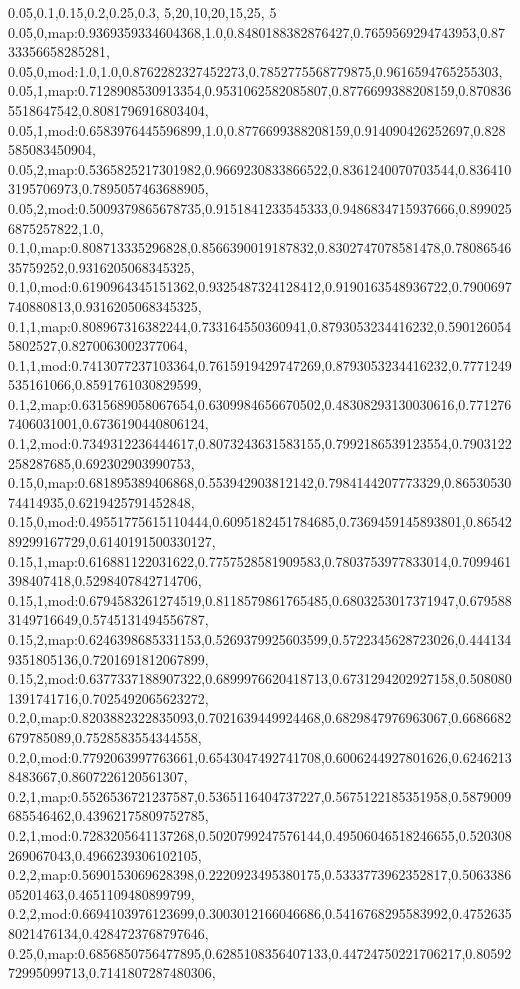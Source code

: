 0.05,0.1,0.15,0.2,0.25,0.3,
5,20,10,20,15,25,
5
0.05,0,map:0.9369359334604368,1.0,0.8480188382876427,0.7659569294743953,0.8733356658285281,
0.05,0,mod:1.0,1.0,0.8762282327452273,0.7852775568779875,0.9616594765255303,
0.05,1,map:0.7128908530913354,0.9531062582085807,0.8776699388208159,0.8708365518647542,0.8081796916803404,
0.05,1,mod:0.6583976445596899,1.0,0.8776699388208159,0.914090426252697,0.828585083450904,
0.05,2,map:0.5365825217301982,0.9669230833866522,0.8361240070703544,0.8364103195706973,0.7895057463688905,
0.05,2,mod:0.5009379865678735,0.9151841233545333,0.9486834715937666,0.8990256875257822,1.0,
0.1,0,map:0.808713335296828,0.8566390019187832,0.8302747078581478,0.7808654635759252,0.9316205068345325,
0.1,0,mod:0.6190964345151362,0.9325487324128412,0.9190163548936722,0.7900697740880813,0.9316205068345325,
0.1,1,map:0.808967316382244,0.733164550360941,0.8793053234416232,0.5901260545802527,0.8270063002377064,
0.1,1,mod:0.7413077237103364,0.7615919429747269,0.8793053234416232,0.7771249535161066,0.8591761030829599,
0.1,2,map:0.6315689058067654,0.6309984656670502,0.48308293130030616,0.7712767406031001,0.6736190440806124,
0.1,2,mod:0.7349312236444617,0.8073243631583155,0.7992186539123554,0.7903122258287685,0.692302903990753,
0.15,0,map:0.681895389406868,0.553942903812142,0.7984144207773329,0.8653053074414935,0.6219425791452848,
0.15,0,mod:0.49551775615110444,0.6095182451784685,0.7369459145893801,0.8654289299167729,0.6140191500330127,
0.15,1,map:0.616881122031622,0.7757528581909583,0.7803753977833014,0.7099461398407418,0.5298407842714706,
0.15,1,mod:0.6794583261274519,0.8118579861765485,0.6803253017371947,0.6795883149716649,0.5745131494556787,
0.15,2,map:0.6246398685331153,0.5269379925603599,0.5722345628723026,0.4441349351805136,0.7201691812067899,
0.15,2,mod:0.6377337188907322,0.6899976620418713,0.6731294202927158,0.5080801391741716,0.7025492065623272,
0.2,0,map:0.8203882322835093,0.7021639449924468,0.6829847976963067,0.6686682679785089,0.7528583554344558,
0.2,0,mod:0.7792063997763661,0.6543047492741708,0.6006244927801626,0.62462138483667,0.8607226120561307,
0.2,1,map:0.5526536721237587,0.5365116404737227,0.5675122185351958,0.5879009685546462,0.43962175809752785,
0.2,1,mod:0.7283205641137268,0.5020799247576144,0.49506046518246655,0.520308269067043,0.4966239306102105,
0.2,2,map:0.5690153069628398,0.2220923495380175,0.5333773962352817,0.506338605201463,0.4651109480899799,
0.2,2,mod:0.6694103976123699,0.3003012166046686,0.5416768295583992,0.47526358021476134,0.4284723768797646,
0.25,0,map:0.6856850756477895,0.6285108356407133,0.44724750221706217,0.8059272995099713,0.7141807287480306,
